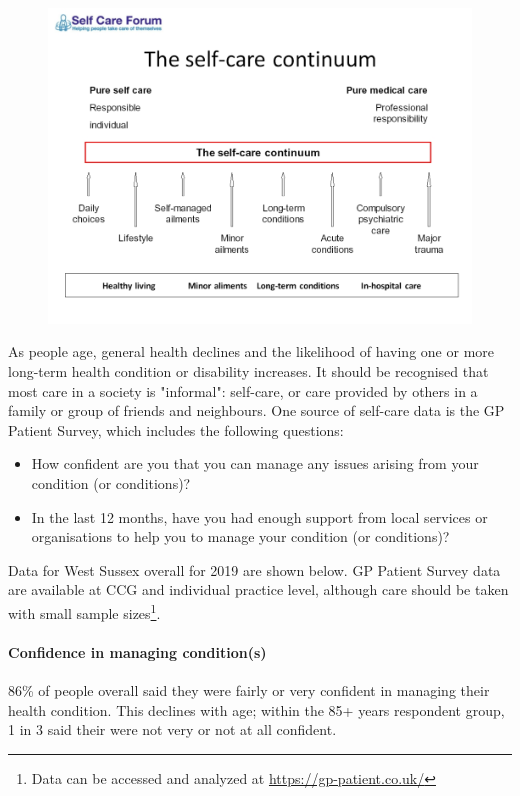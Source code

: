 \begin{figure}
    \includegraphics[width=\linewidth]{images/04-self-care-continuum.jpeg}
\end{figure}

As people age, general health declines and the likelihood of having one or more long-term health condition or disability increases. It should be recognised that most care in a society is "informal": self-care, or care provided by others in a family or group of friends and neighbours. One source of self-care data is the GP Patient Survey, which includes the following questions:

\begin{itemize}[noitemsep]
    \item How confident are you that you can manage any issues arising from your condition (or conditions)?
    \item In the last 12 months, have you had enough support from local services or organisations to help you to manage your condition (or conditions)?
\end{itemize}

Data for West Sussex overall for 2019 are shown below. GP Patient Survey data are available at CCG and individual practice level, although care should be taken with small sample sizes\footnote{Data can be accessed and analyzed at \url{https://gp-patient.co.uk/}}.

\paragraph{Confidence in managing condition(s)} 86\% of people overall said they were fairly or very confident in managing their health condition. This declines with age; within the 85+ years respondent group, 1 in 3 said their were not very or not at all confident.

